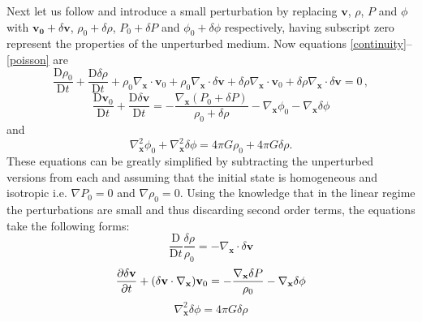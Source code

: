 \documentclass[english, oneside]{HYgradu}
\begin{document}
Next let us follow \citet{longair2008galaxy} and introduce a small perturbation by replacing $\mathbf{v}$, $\rho$, $P$ and $\phi$ with $\mathbf{v_0} + \delta\mathbf{v}$, $\rho_0 + \delta\rho$, $P_0 + \delta P$ and $\phi_0 + \delta \phi$ respectively, having subscript zero represent the properties of the unperturbed medium. Now equations \ref{continuity}--\ref{poisson} are
\begin{equation}
\frac{\textrm{D}\rho_0}{\textrm{D}t} + \frac{\textrm{D}\delta\rho}{\textrm{D}t} + \rho_0 \nabla_\mathbf{x}\cdot{\mathbf{v}_0} + \rho_0 \nabla_\mathbf{x} \cdot\delta{\mathbf{v}} + \delta \rho \nabla_\mathbf{x} \cdot{\mathbf{v}}_0 + \delta\rho \nabla_\mathbf{x} \cdot\delta{\mathbf{v}}  = 0 \,,
\end{equation}
\begin{equation}
\frac{\textrm{D} \mathbf{v}_0}{\textrm{D}t} + \frac{\textrm{D} \delta\mathbf{v}}{\textrm{D}t}= - \frac{\nabla_\mathbf{x} (P_0 + \delta P)}{\rho_0 + \delta \rho} - \nabla_\mathbf{x}\phi_0 - \nabla_\mathbf{x}\delta\phi
\end{equation}
and
\begin{equation}
\nabla_\mathbf{x}^2\phi_0 + \nabla_\mathbf{x}^2\delta\phi = 4\pi G\rho_0 + 4\pi G\delta\rho.
\end{equation}
These equations can be greatly simplified by subtracting the unperturbed versions from each and assuming that the initial state is homogeneous and isotropic i.e. $\nabla P_0=0$ and $\nabla \rho_0 = 0$. Using the knowledge that in the linear regime the perturbations are small and thus discarding second order terms, the equations take the following forms:
\begin{equation}
\frac{\textrm{D}}{\textrm{D}t} \frac{\delta \rho}{\rho_0} = -\nabla_\mathbf{x} \cdot \delta \mathbf{v}
\end{equation}
\begin{equation}
\pdv{\delta \mathbf{v}}{t} + (\delta \mathbf{v} \cdot \nabla_\mathbf{x}) \mathbf{v}_0 = - \frac{\nabla_\mathbf{x} \delta P}{\rho_0} - \nabla_\mathbf{x} \delta \phi
\end{equation}
\begin{equation}
\nabla_\mathbf{x}^2\delta \phi = 4 \pi G \delta \rho
\end{equation}
\end{document}
